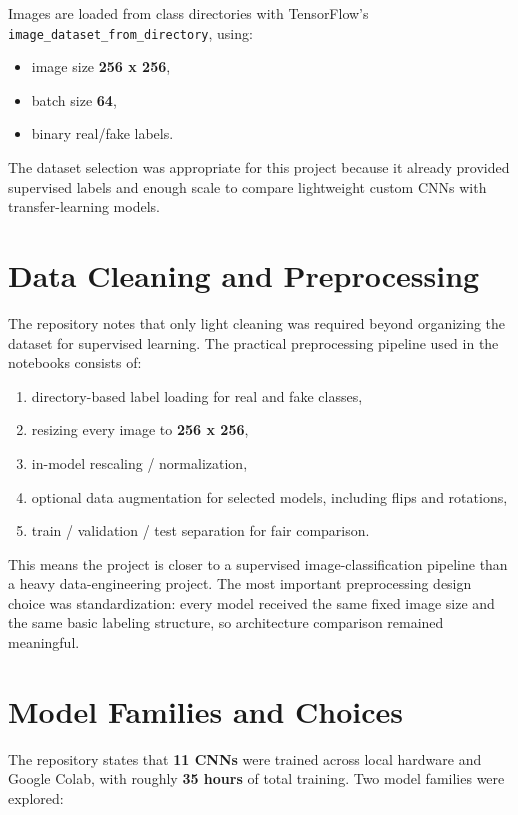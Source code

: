\documentclass[11pt]{article}
\begin{document}
Images are loaded from class directories with TensorFlow's \texttt{image\_dataset\_from\_directory}, using:
\begin{itemize}[leftmargin=1.5em]
    \item image size \textbf{256 x 256},
    \item batch size \textbf{64},
    \item binary real/fake labels.
\end{itemize}

The dataset selection was appropriate for this project because it already provided supervised labels and enough scale to compare lightweight custom CNNs with transfer-learning models.

\section{Data Cleaning and Preprocessing}

The repository notes that only light cleaning was required beyond organizing the dataset for supervised learning. The practical preprocessing pipeline used in the notebooks consists of:
\begin{enumerate}[leftmargin=1.5em]
    \item directory-based label loading for real and fake classes,
    \item resizing every image to \textbf{256 x 256},
    \item in-model rescaling / normalization,
    \item optional data augmentation for selected models, including flips and rotations,
    \item train / validation / test separation for fair comparison.
\end{enumerate}

This means the project is closer to a supervised image-classification pipeline than a heavy data-engineering project. The most important preprocessing design choice was standardization: every model received the same fixed image size and the same basic labeling structure, so architecture comparison remained meaningful.

\section{Model Families and Choices}

The repository states that \textbf{11 CNNs} were trained across local hardware and Google Colab, with roughly \textbf{35 hours} of total training. Two model families were explored:
\end{document}
